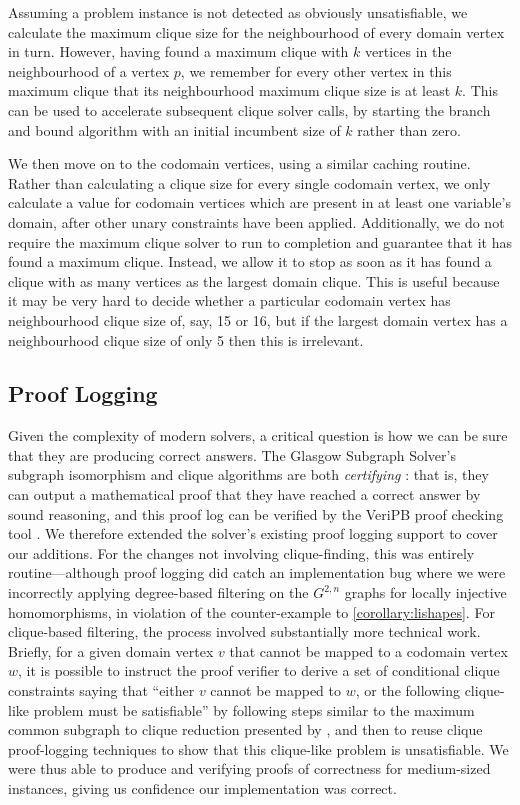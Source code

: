 \documentclass{article}
\newcommand{\citet}[1]{\citeauthor{#1} \shortcite{#1}}
\begin{document}
Assuming a problem instance is not detected as obviously unsatisfiable, we calculate the maximum
clique size for the neighbourhood of every domain vertex in turn. However, having found a maximum
clique with $k$ vertices in the neighbourhood of a vertex $p$, we remember for every other vertex in
this maximum clique that its neighbourhood maximum clique size is at least $k$. This can be used to
accelerate subsequent clique solver calls, by starting the branch and bound algorithm with an
initial incumbent size of $k$ rather than zero.

We then move on to the codomain vertices, using a similar caching routine. Rather than calculating a
clique size for every single codomain vertex, we only calculate a value for codomain vertices which are
present in at least one variable's domain, after other unary constraints have been applied.
Additionally, we do not require the maximum clique solver to run to completion and guarantee that it
has found a maximum clique. Instead, we allow it to stop as soon as it has found a clique with as
many vertices as the largest domain clique. This is useful because it may be very hard to decide
whether a particular codomain vertex has neighbourhood clique size of, say, 15 or 16, but if the
largest domain vertex has a neighbourhood clique size of only 5 then this is irrelevant.

\subsection{Proof Logging}

Given the complexity of modern solvers, a critical question is how we can be sure that they are
producing correct answers. The Glasgow Subgraph Solver's subgraph isomorphism and clique algorithms
are both \emph{certifying} \cite{DBLP:journals/csr/McConnellMNS11}: that is, they can output a
mathematical proof that they have reached a correct answer by sound reasoning, and this proof log
can be verified by the VeriPB proof checking tool
\cite{DBLP:conf/cp/GochtMMNPT20,DBLP:conf/ijcai/GochtMN20}. We therefore extended the solver's
existing proof logging support to cover our additions. For the changes not involving clique-finding,
this was entirely routine---although proof logging did catch an implementation bug where we were
incorrectly applying degree-based filtering on the $G^{2,n}$ graphs for locally injective
homomorphisms, in violation of the counter-example to \cref{corollary:lishapes}. For clique-based
filtering, the process involved substantially more technical work. Briefly, for a given domain
vertex $v$ that cannot be mapped to a codomain vertex $w$, it is possible to instruct the proof
verifier to derive a set of conditional clique constraints saying that ``either $v$ cannot be mapped
to $w$, or the following clique-like problem must be satisfiable'' by following steps similar to the
maximum common subgraph to clique reduction presented by \citet{DBLP:conf/cp/GochtMMNPT20}, and then
to reuse clique proof-logging techniques to show that this clique-like problem is unsatisfiable.  We
were thus able to produce and verifying proofs of correctness for medium-sized instances, giving us
confidence our implementation was correct.
\end{document}
